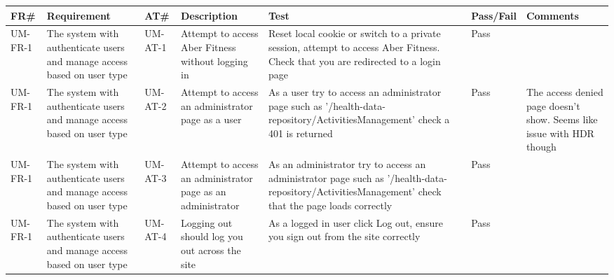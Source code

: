 \begin{longtable}{ |l|p{3cm}|l|p{5cm}|p{5cm}|l|p{6.5cm}|}
\hline
\textbf{FR\#}	&	\textbf{Requirement} & \textbf{AT\#}	&	\textbf{Description} & \textbf{Test} & \textbf{Pass/Fail} &	\textbf{Comments} \\
\hline
\endhead

UM-FR-1 & The system with authenticate users and manage access based on user type & UM-AT-1 & Attempt to access Aber Fitness without logging in & Reset local cookie or switch to a private session, attempt to access Aber Fitness. Check that you are redirected to a login page & Pass &  \\ \hline
UM-FR-1 & The system with authenticate users and manage access based on user type & UM-AT-2 & Attempt to access an administrator page as a user & As a user try to access an administrator page such as '/health-data-repository/ActivitiesManagement' check a 401 is returned & Pass & The access denied page doesn't show. Seems like issue with HDR though \\ \hline
UM-FR-1 & The system with authenticate users and manage access based on user type & UM-AT-3 & Attempt to access an administrator page as an administrator & As an administrator try to access an administrator page such as '/health-data-repository/ActivitiesManagement' check that the page loads correctly & Pass &  \\ \hline
UM-FR-1 & The system with authenticate users and manage access based on user type & UM-AT-4 & Logging out should log you out across the site & As a logged in user click Log out, ensure you sign out from the site correctly & Pass &  \\ \hline


\end{longtable}